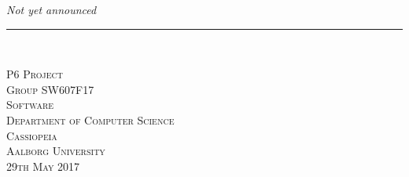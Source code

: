 	\thispagestyle{empty}
\begin{flushright}
\vspace{3cm}

\phantom{hul}

\phantom{hul}

\phantom{hul}

\textsl{\Huge Not yet announced} \\ \vspace{1cm}

\rule{13cm}{3mm} \\ \vspace{1.5cm}
\vspace{1cm}



\vspace{7cm} 
\textsc{\Large P6 Project \\
Group SW607F17 \\
Software\\
Department of Computer Science \\
Cassiopeia \\
Aalborg University\\
29th May 2017\\}
\end{flushright}
